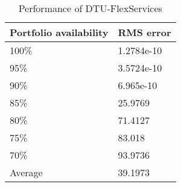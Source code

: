 \begin{table}[!t]%
\renewcommand{\arraystretch}{1.3}
\caption{Performance of DTU-FlexServices}
\label{tab:results}
\centering
\begin{tabular}{ll}
\toprule
Portfolio availability & RMS error\\
\midrule
100\% & 1.2784e-10\\
95\%  & 3.5724e-10\\
90\%  & 6.965e-10\\
85\%  & 25.9769\\
80\%  & 71.4127\\
75\%  & 83.018\\
70\%  & 93.9736\\
\midrule
Average & 39.1973\\
\bottomrule
\end{tabular}
\end{table}
